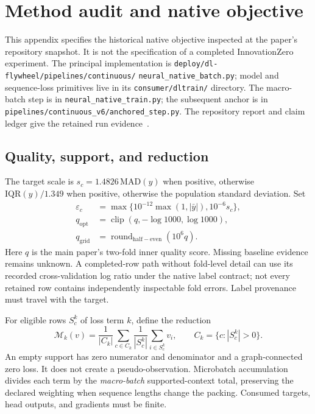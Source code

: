 \section{Method audit and native objective}
\label{app:methods}

This appendix specifies the historical native objective inspected at the paper's
repository snapshot. It is not the specification of a completed InnovationZero
experiment. The principal implementation is
\texttt{deploy/dl-flywheel/pipelines/continuous/}\allowbreak
\texttt{neural\_native\_batch.py}; model and sequence-loss primitives live in its
\texttt{consumer/dltrain/} directory. The macro-batch step is in
\texttt{neural\_native\_train.py}; the subsequent anchor is in
\texttt{pipelines/continuous\_v6/anchored\_step.py}. The repository report and
claim ledger give the retained run evidence~\citep{clover,jope}.

\subsection{Quality, support, and reduction}

The target scale is $s_c=1.4826\,\mathrm{MAD}(y)$ when positive, otherwise
$\mathrm{IQR}(y)/1.349$ when positive, otherwise the population standard
deviation. Set
\begin{align}
 \varepsilon_c&=\max\{10^{-12}\max(1,|\bar y|),10^{-6}s_c\},\nonumber\\
 q_{\mathrm{opt}}&=\operatorname{clip}(q,-\log1000,\log1000),\nonumber\\
 q_{\mathrm{grid}}&=\operatorname{round}_{\mathrm{half-even}}(10^6q).
\end{align}
Here $q$ is the main paper's two-fold inner quality score. Missing baseline evidence remains
unknown. A completed-row path without fold-level detail can use its recorded
cross-validation log ratio under the native label contract; not every retained
row contains independently inspectable fold errors. Label provenance must travel
with the target.

For eligible rows $S_c^k$ of loss term $k$, define the reduction
\begin{equation}
 \mathcal{M}_k(v)=\frac{1}{|C_k|}\sum_{c\in C_k}
 \frac{1}{|S_c^k|}\sum_{i\in S_c^k}v_i,
 \qquad C_k=\{c:|S_c^k|>0\}.
\end{equation}
An empty support has zero numerator and denominator and a graph-connected zero
loss. It does not create a pseudo-observation. Microbatch accumulation divides
each term by the \emph{macro-batch} supported-context total, preserving the
declared weighting when sequence lengths change the packing. Consumed targets,
head outputs, and gradients must be finite.

